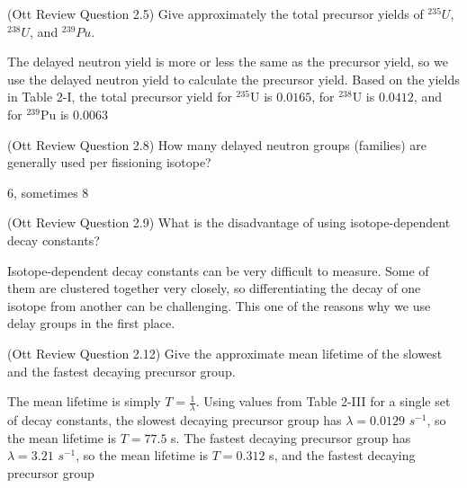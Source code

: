 \documentclass[11pt,addpoints,answers]{exam}
\begin{document}
\begin{questions}
        \question[10] (Ott Review Question 2.5)
        Give approximately the total precursor yields of $^{235}U$, $^{238}U$, 
        and $^{239}Pu$.
                \begin{solution}
                    The delayed neutron yield is more or less the same as the
                    precursor yield, so we use the delayed neutron yield to
                    calculate the precursor yield.
                    Based on the yields in Table 2-I, the total precursor yield
                    for $^{235}$U is $0.0165$,
                    for $^{238}$U is $0.0412$, and for $^{239}$Pu is $0.0063$
                \end{solution}

        \question[10] (Ott Review Question 2.8)
        How many delayed neutron groups (families) are generally used per 
        fissioning isotope?
                \begin{solution}
                    6, sometimes 8
                \end{solution}

        \question[10] (Ott Review Question 2.9)
        What is the disadvantage of using isotope-dependent decay constants?
                \begin{solution}
                    Isotope-dependent decay constants can be very difficult to
                    measure. Some of them are clustered together very closely,
                    so differentiating the decay of one isotope from another can
                    be challenging. This one of the reasons why we use delay
                    groups in the first place.
                \end{solution}

        \question[10] (Ott Review Question 2.12)
        Give the approximate mean lifetime of the slowest and the fastest 
        decaying precursor group.
                \begin{solution}
                    The mean lifetime is simply $T = \frac{1}{\lambda}$. Using
                    values from Table 2-III for a single set of decay constants,
                    the slowest decaying precursor group has $\lambda = 0.0129$
                    $s^{-1}$, so the mean lifetime is $T = 77.5$ s. The fastest
                    decaying precursor group has $\lambda = 3.21$ $s^{-1}$, so
                    the mean lifetime is $T = 0.312$ s, and the fastest decaying
                    precursor group 
                \end{solution}

\end{questions}



%
%
\end{document}
